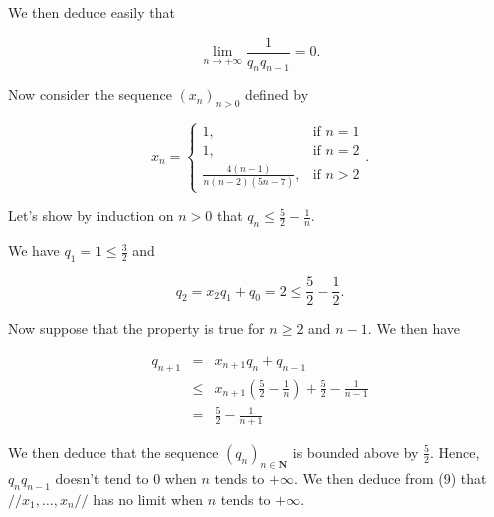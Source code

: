 \documentclass[a4paper,12pt]{article}
\begin{document}
We then deduce easily that

\[ \lim_{n\to +\infty}\frac{1}{q_nq_{n-1}} = 0.\]

Now consider the sequence $(x_n)_{n>0}$ defined by

\[
x_n = \left\{
\begin{array}{ll}
  1,&\mbox{if $n=1$}\\
  1,&\mbox{if $n=2$}\\
  \frac{4(n-1)}{n(n-2)(5n-7)},&\mbox{if $n>2$}
\end{array}
\right.
.\]

Let's show by induction on $n>0$ that $q_n \le \frac{5}{2} -
\frac{1}{n}$.

We have $q_1 = 1 \le \frac{3}{2}$ and

\[  q_2 = x_2 q_1 + q_0 = 2 \le \frac{5}{2} - \frac{1}{2}.\]

Now suppose that the property is true for $n \ge 2$ and $n-1$.  We
then have

\begin{eqnarray*}
  q_{n+1} &=& x_{n+1} q_n + q_{n-1} \\
  &\le& x_{n+1}\left(\frac{5}{2} - \frac{1}{n}\right) + \frac{5}{2} -
  \frac{1}{n-1} \\
  &=& \frac{5}{2} - \frac{1}{n+1}
\end{eqnarray*}

We then deduce that the sequence $(q_n)_{n\in \mathbf{N}}$ is bounded
above by $\frac{5}{2}$. Hence, $q_nq_{n-1}$ doesn't tend to $0$ when
$n$ tends to $+\infty$.  We then deduce from (9) that
$//x_1,\ldots,x_n//$ has no limit when $n$ tends to $+\infty$.
\end{document}
